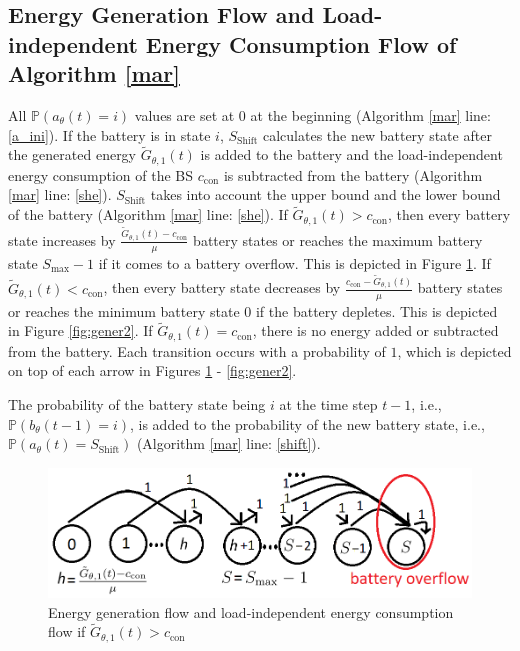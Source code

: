 \subsection{Energy Generation Flow and Load-independent Energy Consumption Flow of Algorithm \ref{mar}}

All $\mathbb{P}(a_\theta(t)=i)$ values are set at $0$ at the beginning (Algorithm \ref{mar} line: \ref{a_ini}).
If the battery is in state $i$, $S_{\mathrm{Shift}}$ calculates the new battery state after the generated energy $\tilde{G}_{\theta,1}(t)$ is added to the battery and the load-independent energy consumption of the BS $c_{\mathrm{con}}$ is subtracted from the battery (Algorithm \ref{mar} line: \ref{she}). $S_{\mathrm{Shift}}$ takes into account the upper bound and the lower bound of the battery (Algorithm \ref{mar} line: \ref{she}).
If $\tilde{G}_{\theta,1}(t)>c_{\mathrm{con}}$, then every battery state increases by $\frac{\tilde{G}_{\theta,1}(t)-c_{\mathrm{con}}}{\mu}$ battery states or reaches the maximum battery state $S_{\mathrm{max}}-1$ if it comes to a battery overflow. This is depicted in Figure \ref{fig:gener}.
If $\tilde{G}_{\theta,1}(t)<c_{\mathrm{con}}$, then every battery state decreases by $\frac{c_{\mathrm{con}}-\tilde{G}_{\theta,1}(t)}{\mu}$ battery states or reaches the minimum battery state $0$ if the battery depletes. This is depicted in Figure \ref{fig:gener2}.
If $\tilde{G}_{\theta,1}(t)=c_{\mathrm{con}}$, there is no energy added or subtracted from the battery.
Each transition occurs with a probability of $1$, which is depicted on top of each arrow in Figures \ref{fig:gener} - \ref{fig:gener2}.

The probability of the battery state being $i$ at the time step $t-1$, i.e., $\mathbb{P}(b_\theta(t-1)=i)$, is added to the probability of the new battery state, i.e., $\mathbb{P}(a_\theta(t)=S_{\mathrm{Shift}})$ (Algorithm \ref{mar} line: \ref{shift}).






\begin{figure}[H]
	\centering
		\includegraphics[scale=0.6]{pictures/1}
	\caption{Energy generation flow and load-independent energy consumption flow if $\tilde{G}_{\theta,1}(t)>c_{\mathrm{con}}$\label{fig:gener}}
\end{figure}

